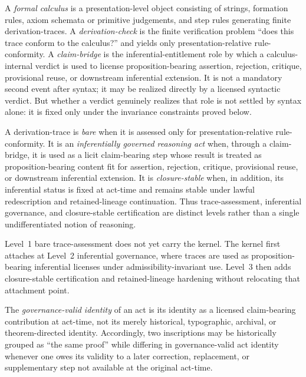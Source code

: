 \begin{definition}
\label{def:A-formal-calculus}
A \emph{formal calculus} is a presentation-level object consisting of strings, formation rules, axiom schemata or primitive judgements, and step rules generating finite derivation-traces. A \emph{derivation-check} is the finite verification problem ``does this trace conform to the calculus?'' and yields only presentation-relative rule-conformity. A \emph{claim-bridge} is the inferential-entitlement role by which a calculus-internal verdict is used to license proposition-bearing assertion, rejection, critique, provisional reuse, or downstream inferential extension. It is not a mandatory second event after syntax; it may be realized directly by a licensed syntactic verdict. But whether a verdict genuinely realizes that role is not settled by syntax alone: it is fixed only under the invariance constraints proved below.
\end{definition}

\begin{definition}
\label{def:A-bare-trace}
A derivation-trace is \emph{bare} when it is assessed only for presentation-relative rule-conformity. It is an \emph{inferentially governed reasoning act} when, through a claim-bridge, it is used as a licit claim-bearing step whose result is treated as proposition-bearing content fit for assertion, rejection, critique, provisional reuse, or downstream inferential extension. It is \emph{closure-stable} when, in addition, its inferential status is fixed at act-time and remains stable under lawful redescription and retained-lineage continuation. Thus trace-assessment, inferential governance, and closure-stable certification are distinct levels rather than a single undifferentiated notion of reasoning.
\end{definition}



\begin{remark}
Level~1 bare trace-assessment does not yet carry the kernel. The kernel first attaches at Level~2 inferential governance, where traces are used as proposition-bearing inferential licenses under admissibility-invariant use. Level~3 then adds closure-stable certification and retained-lineage hardening without relocating that attachment point.
\end{remark}

\begin{definition}
\label{def:A-act-identity}
The \emph{governance-valid identity} of an act is its identity as a licensed claim-bearing contribution at act-time, not its merely historical, typographic, archival, or theorem-directed identity. Accordingly, two inscriptions may be historically grouped as ``the same proof'' while differing in governance-valid act identity whenever one owes its validity to a later correction, replacement, or supplementary step not available at the original act-time.
\end{definition}


